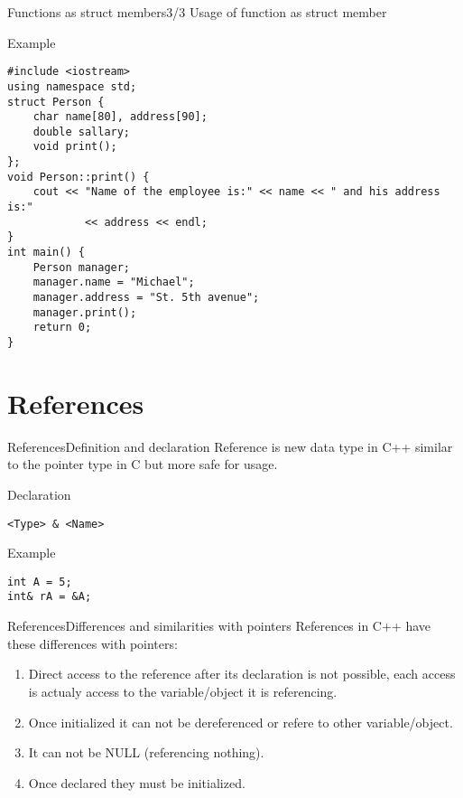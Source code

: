 \begin{frame}[fragile]{Functions as struct members}{3/3}
Usage of function as struct member
\begin{exampleblock}{Example}
\begin{lstlisting}
#include <iostream>
using namespace std;
struct Person {
    char name[80], address[90];
    double sallary;
    void print();
};
void Person::print() {
    cout << "Name of the employee is:" << name << " and his address is:"
            << address << endl;
}
int main() {
    Person manager;
    manager.name = "Michael";
    manager.address = "St. 5th avenue";
    manager.print();
    return 0;
}
\end{lstlisting}
\end{exampleblock}
\end{frame}

\section{References}

\begin{frame}[fragile]{References}{Definition and declaration} 
Reference is new data type in C++ similar to the pointer type in C but more safe
for usage.
\begin{exampleblock}{Declaration}
\begin{lstlisting}
<Type> & <Name>
\end{lstlisting}
\end{exampleblock}

\begin{exampleblock}{Example}
\begin{lstlisting}
int A = 5;
int& rA = &A;
\end{lstlisting}
\end{exampleblock}
\end{frame}

\begin{frame}[fragile]{References}{Differences and similarities with
pointers} 
References in C++ have these differences with pointers:
\begin{enumerate}
  \item Direct access to the reference after its declaration is not possible,
  each access is actualy access to the variable/object it is referencing.
  \item Once initialized it can not be dereferenced or refere to other
  variable/object.
  \item It can not be NULL (referencing nothing).
  \item Once declared they must be initialized.
\end{enumerate}
\end{frame}


